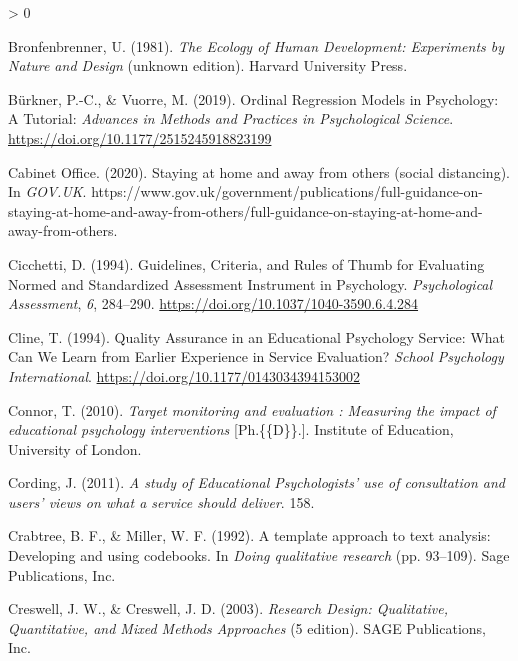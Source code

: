 \documentclass[
  english,
  man]{apa}
\newlength{\cslhangindent}
\newenvironment{CSLReferences}[2] %
 {%
  \setlength{\parindent}{0pt}
  \ifodd #1 \everypar{\setlength{\hangindent}{\cslhangindent}}\ignorespaces\fi
  \ifnum #2 > 0
  \setlength{\parskip}{#2\baselineskip}
  \fi
 }%
 {}
\begin{document}
\begin{CSLReferences}{1}{0}
\leavevmode\hypertarget{ref-bronfenbrennerEcologyHumanDevelopment1981}{}%
Bronfenbrenner, U. (1981). \emph{The {Ecology} of {Human Development}: {Experiments} by {Nature} and {Design}} (unknown edition). {Harvard University Press}.

\leavevmode\hypertarget{ref-burknerOrdinalRegressionModels2019}{}%
Bürkner, P.-C., \& Vuorre, M. (2019). Ordinal {Regression Models} in {Psychology}: {A Tutorial}: \emph{Advances in Methods and Practices in Psychological Science}. \url{https://doi.org/10.1177/2515245918823199}

\leavevmode\hypertarget{ref-cabinetofficeStayingHomeAway2020}{}%
Cabinet Office. (2020). Staying at home and away from others (social distancing). In \emph{GOV.UK}. https://www.gov.uk/government/publications/full-guidance-on-staying-at-home-and-away-from-others/full-guidance-on-staying-at-home-and-away-from-others.

\leavevmode\hypertarget{ref-cicchettiGuidelinesCriteriaRules1994}{}%
Cicchetti, D. (1994). Guidelines, {Criteria}, and {Rules} of {Thumb} for {Evaluating Normed} and {Standardized Assessment Instrument} in {Psychology}. \emph{Psychological Assessment}, \emph{6}, 284--290. \url{https://doi.org/10.1037/1040-3590.6.4.284}

\leavevmode\hypertarget{ref-clineQualityAssuranceEducational1994a}{}%
Cline, T. (1994). Quality {Assurance} in an {Educational Psychology Service}: {What Can We Learn} from {Earlier Experience} in {Service Evaluation}? \emph{School Psychology International}. \url{https://doi.org/10.1177/0143034394153002}

\leavevmode\hypertarget{ref-connorTargetMonitoringEvaluation2010}{}%
Connor, T. (2010). \emph{Target monitoring and evaluation : Measuring the impact of educational psychology interventions} {[}Ph.\{\{D\}\}.{]}. Institute of Education, University of London.

\leavevmode\hypertarget{ref-cordingStudyEducationalPsychologists2011}{}%
Cording, J. (2011). \emph{A study of {Educational Psychologists}' use of consultation and users' views on what a service should deliver}. 158.

\leavevmode\hypertarget{ref-crabtreeTemplateApproachText1992}{}%
Crabtree, B. F., \& Miller, W. F. (1992). A template approach to text analysis: {Developing} and using codebooks. In \emph{Doing qualitative research} (pp. 93--109). {Sage Publications, Inc}.

\leavevmode\hypertarget{ref-creswellResearchDesignQualitative2003a}{}%
Creswell, J. W., \& Creswell, J. D. (2003). \emph{Research {Design}: {Qualitative}, {Quantitative}, and {Mixed Methods Approaches}} (5 edition). {SAGE Publications, Inc}.


\end{CSLReferences}
\end{document}
